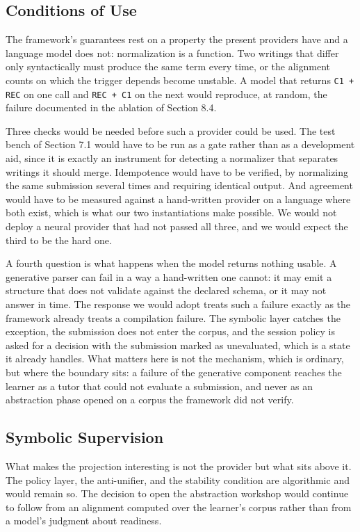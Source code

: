 \documentclass[10pt,twocolumn,letterpaper]{article}
\begin{document}
\subsection{Conditions of Use}
The framework's guarantees rest on a property the present providers have and a language model does not: normalization is a function. Two writings that differ only syntactically must produce the same term every time, or the alignment counts on which the trigger depends become unstable. A model that returns \texttt{C1 + REC} on one call and \texttt{REC + C1} on the next would reproduce, at random, the failure documented in the ablation of Section 8.4.

Three checks would be needed before such a provider could be used. The test bench of Section 7.1 would have to be run as a gate rather than as a development aid, since it is exactly an instrument for detecting a normalizer that separates writings it should merge. Idempotence would have to be verified, by normalizing the same submission several times and requiring identical output. And agreement would have to be measured against a hand-written provider on a language where both exist, which is what our two instantiations make possible. We would not deploy a neural provider that had not passed all three, and we would expect the third to be the hard one.

A fourth question is what happens when the model returns nothing usable. A generative parser can fail in a way a hand-written one cannot: it may emit a structure that does not validate against the declared schema, or it may not answer in time. The response we would adopt treats such a failure exactly as the framework already treats a compilation failure. The symbolic layer catches the exception, the submission does not enter the corpus, and the session policy is asked for a decision with the submission marked as unevaluated, which is a state it already handles. What matters here is not the mechanism, which is ordinary, but where the boundary sits: a failure of the generative component reaches the learner as a tutor that could not evaluate a submission, and never as an abstraction phase opened on a corpus the framework did not verify.

\subsection{Symbolic Supervision}
What makes the projection interesting is not the provider but what sits above it. The policy layer, the anti-unifier, and the stability condition are algorithmic and would remain so. The decision to open the abstraction workshop would continue to follow from an alignment computed over the learner's corpus rather than from a model's judgment about readiness.
\end{document}
